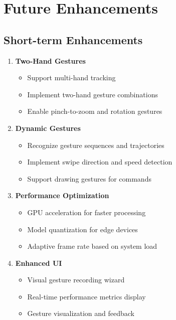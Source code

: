 \documentclass[12pt,a4paper]{report}
\begin{document}
\section{Future Enhancements}

\subsection{Short-term Enhancements}

\begin{enumerate}
    \item \textbf{Two-Hand Gestures}
    \begin{itemize}
        \item Support multi-hand tracking
        \item Implement two-hand gesture combinations
        \item Enable pinch-to-zoom and rotation gestures
    \end{itemize}
    
    \item \textbf{Dynamic Gestures}
    \begin{itemize}
        \item Recognize gesture sequences and trajectories
        \item Implement swipe direction and speed detection
        \item Support drawing gestures for commands
    \end{itemize}
    
    \item \textbf{Performance Optimization}
    \begin{itemize}
        \item GPU acceleration for faster processing
        \item Model quantization for edge devices
        \item Adaptive frame rate based on system load
    \end{itemize}
    
    \item \textbf{Enhanced UI}
    \begin{itemize}
        \item Visual gesture recording wizard
        \item Real-time performance metrics display
        \item Gesture visualization and feedback
    \end{itemize}
\end{enumerate}
\end{document}
